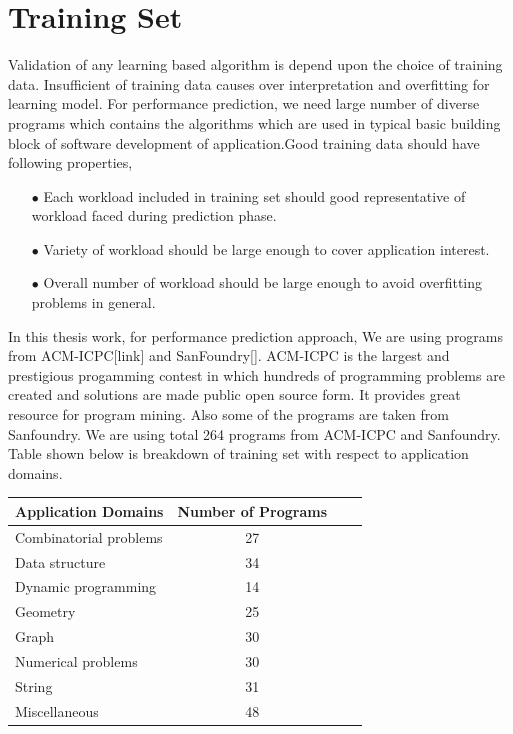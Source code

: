 \section{Training Set}
Validation of any learning based algorithm is depend upon the choice of training data. Insufficient of training data causes over interpretation and overfitting for learning model. For performance prediction, we need large number of diverse programs which contains the algorithms which are used in typical basic building block of software development of application.Good training data should have following properties, 

\begin{itemize}
\item[$\bullet$] Each workload included in training set should good representative of workload faced during prediction phase.
\item[$\bullet$] Variety of workload should be large enough to cover application interest.
\item[$\bullet$] Overall number of workload should be large enough to avoid overfitting problems in general.
\end{itemize}

\par In this thesis work, for performance prediction approach, We are using programs from ACM-ICPC[link] and SanFoundry[]. ACM-ICPC is the largest and prestigious progamming contest in which hundreds of programming problems are created and solutions are made public open source form. It provides great resource for program mining. Also some of the programs are taken from Sanfoundry. We are using total 264 programs from ACM-ICPC and Sanfoundry. Table shown below is breakdown of training set with respect to application domains.

\begin{tabular}{|l|c|r|p{1.7cm}|}
  \hline
  \textbf{Application Domains} & \textbf{Number of Programs}\\
  \hline
  Combinatorial problems & 27\\
  \hline
  Data structure & 34\\
  \hline
  Dynamic programming & 14\\
  \hline
  Geometry & 25\\
  \hline
  Graph & 30\\
  \hline
  Numerical problems & 30\\
  \hline
  String & 31\\
  \hline
  Miscellaneous & 48\\
  \hline
\end{tabular}

